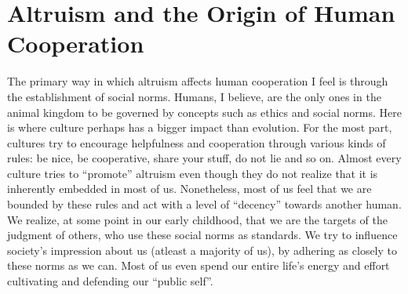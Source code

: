 \documentclass[12pt, letter]{article}
\begin{document}
\section*{Altruism and the Origin of Human Cooperation}

The primary way in which altruism affects human cooperation I feel is through the establishment of social norms. Humans, I believe, are the only ones in the animal kingdom to be governed by concepts such as ethics and social norms. Here is where culture perhaps has a bigger impact than evolution. For the most part, cultures try to encourage helpfulness and cooperation through various kinds of rules: be nice, be cooperative, share your stuff, do not lie and so on. Almost every culture tries to ``promote'' altruism even though they do not realize that it is inherently embedded in most of us. Nonetheless, most of us feel that we are bounded by these rules and act with a level of ``decency'' towards another human. We realize, at some point in our early childhood, that we are the targets of the judgment of others, who use these social norms as standards. We try to influence society's impression about us (atleast a majority of us), by adhering as closely to these norms as we can. Most of us even spend our entire life's energy and effort cultivating and defending our ``public self''.
\end{document}
